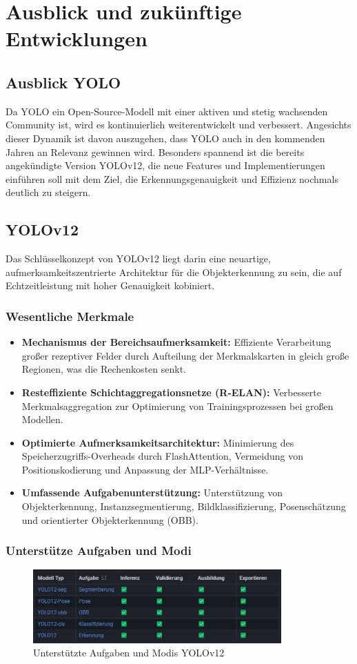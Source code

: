 \section{Ausblick und zukünftige Entwicklungen}
\subsection{Ausblick YOLO}
Da YOLO ein Open-Source-Modell mit einer aktiven und stetig wachsenden Community ist, wird es kontinuierlich weiterentwickelt und verbessert. Angesichts dieser Dynamik ist davon auszugehen, dass YOLO auch in den kommenden Jahren an Relevanz gewinnen wird. Besonders spannend ist die bereits angekündigte Version YOLOv12, die neue Features und Implementierungen einführen soll mit dem Ziel, die Erkennungsgenauigkeit und Effizienz nochmals deutlich zu steigern.
\subsection{YOLOv12}
Das Schlüsselkonzept von YOLOv12 liegt darin eine neuartige, aufmerksamkeitszentrierte Architektur für die Objekterkennung zu sein, die auf Echtzeitleistung mit hoher Genauigkeit kobiniert.
\subsubsection{Wesentliche Merkmale}
\begin{itemize}
    \item \textbf{Mechanismus der Bereichsaufmerksamkeit:} Effiziente Verarbeitung großer rezeptiver Felder durch Aufteilung der Merkmalskarten in gleich große Regionen, was die Rechenkosten senkt.
    \item \textbf{Resteffiziente Schichtaggregationsnetze (R-ELAN):} Verbesserte Merkmalsaggregation zur Optimierung von Trainingsprozessen bei großen Modellen.
    \item \textbf{Optimierte Aufmerksamkeitsarchitektur:} Minimierung des Speicherzugriffs-Overheads durch FlashAttention, Vermeidung von Positionskodierung und Anpassung der MLP-Verhältnisse.
    \item \textbf{Umfassende Aufgabenunterstützung:} Unterstützung von Objekterkennung, Instanzsegmentierung, Bildklassifizierung, Posenschätzung und orientierter Objekterkennung (OBB).
\end{itemize}
\subsubsection{Unterstütze Aufgaben und Modi}
\begin{figure}[ht]
    \centering
    \includegraphics[width=0.85\textwidth]{data/AufgabenUndModiYOLO12.png}
    \caption{Unterstützte Aufgaben und Modis YOLOv12}
    \label{fig:YOLOv12_unterstützte_Modi}
\end{figure}
